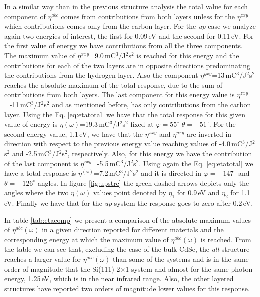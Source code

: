 \documentclass[pss]{wiley2sp} %
\begin{document}
In a similar way than in the previous structure analysis the total value for each component of $\eta^{abc}$ comes from contributions from both layers unless for the  $\eta^{zxy}$ which contributions comes only from the carbon layer. For the \emph{up} case we analyze again two energies of interest, the first for 0.09\,eV and the second for 0.11\,eV. For the first value of energy we have contributions from all the three components. The maximum value of $\eta^{xxy}$=9.0\,mC$^{3}$/J$^{2}$s$^{2}$ is reached for this energy and the contributions for each of the two layers are in opposite directions predominating the contributions from the hydrogen layer. Also the component $\eta^{yxy}$=13\,mC$^{3}$/J$^{2}$s$^{2}$ reaches the absolute maximum of the total response, due to the sum of contributions from both layers. The last component for this energy value is $\eta^{zxy}$=-11\,mC$^{3}$/J$^{2}$s$^{2}$ and as mentioned before, has only contributions from the carbon layer. Using the Eq. \ref{eq:etatotal} we have that the total response for this given value of energy is $\eta(\omega)$=19.3\,mC$^{3}$/J$^{2}$s$^{2}$ fixed at $\varphi=55^{\circ}$ $\theta=-51^{\circ}$. For the second energy value, 1.1\,eV, we have that the $\eta^{xxy}$ and $\eta^{yxy}$ are inverted in direction with respect to the previous energy value reaching values of -4.0\,mC$^{3}$/J$^{2}$s$^{2}$ and -2.5\,mC$^{3}$/J$^{2}$s$^{2}$, respectively. Also, for this energy we have the  contribution of the last component is $\eta^{zxy}$=-5.5\,mC$^{3}$/J$^{2}$s$^{2}$. Using again the Eq. \eqref{eq:etatotal} we have a total response is $\eta^(\omega)$=7.2\,mC$^{3}$/J$^{2}$s$^{2}$ and it is directed in $\varphi=-147^{\circ}$ and $\theta=-126^{\circ}$  angles. In figure \ref{fig:upstrc} the green dashed arrows depicts only the angles where the two $\eta(\omega)$ values point denoted by $\eta_{1}$ for 0.9\,eV and $\eta_{2}$ for 1.1\,eV. Finally we have that for the \emph{up} system the response goes to zero after 0.2\,eV. 

In table \ref{tab:etacomp} we present a comparison of the absolute maximum values of $\eta^{abc}(\omega)$ in a given direction reported for different materials and the corresponding energy at which the maximum value of $\eta^{abc}(\omega)$ is reached. From the table we can see that, excluding the case of the bulk CdSe, the \emph{alt} structure reaches a larger value for $\eta^{abc}(\omega)$ than some of the systems and is in the same order of magnitude that the Si(111) 2$\times$1 system and almost for the same photon energy, 1.25\,eV, which is in the near infrared range. Also, the other layered structures have reported two orders of magnitude lower values for this response. 
\end{document}
